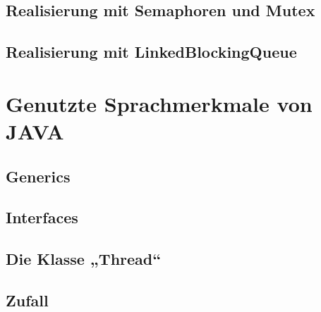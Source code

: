 
\subsection{Realisierung mit Semaphoren und Mutex} %
\label{sub:realisierung_mit_semaphoren_und_mutex}


\subsection{Realisierung mit LinkedBlockingQueue} %
\label{sub:realisierung_mit_linkedblockingqueue}



\newpage
\section{Genutzte Sprachmerkmale von JAVA} %
\label{sec:genutzte_sprachmerkmale_von_java}

\subsection{Generics} %
\label{sub:generics}


\subsection{Interfaces} %
\label{sub:interfaces}


\subsection{Die Klasse „Thread“} %
\label{sub:die_klasse_thread}


\subsection{Zufall} %
\label{sub:zufall}


